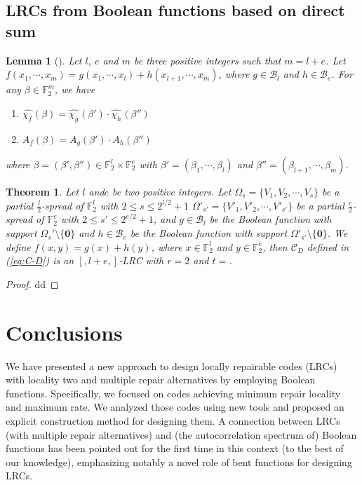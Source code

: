 \documentclass[10pt]{article}
\newtheorem{theorem}{Theorem}
\newtheorem{lemma}{Lemma}
\newcommand{\F}{\mathbb{F}}
\newcommand{\0}{\textbf{0}}
\newcommand{\1}{\textbf{1}}
\newcommand{\C}{{\mathcal C}}
\newcommand{\W}[2][]{\widehat{\chi_{#2}}^{#1}}
\begin{document}
\subsection{LRCs from Boolean functions based on direct sum}
  \begin{lemma}[\cite{Seberry1994}]\label{disjoint}
    Let $l$, $e$ and $m$ be three positive integers such that $m=l+e$.
    Let $f(x_1,\cdots ,x_m)=g(x_1,\cdots, x_l)+h(x_{l+1}, \cdots,x_{m})$, where $g\in\mathcal{B}_l$ and $h\in\mathcal{B}_e$.
    For any $\beta\in\F_2^m$, we have
     \begin{enumerate}
     \item [1)] $\W f(\beta)=\W g(\beta')\cdot \W h(\beta'')$
     \item [2)] $A_f(\beta)=A_g(\beta')\cdot A_h(\beta'')$
     \end{enumerate}
     where $\beta=(\beta',\beta'')\in\F_2^l\times \F_2^{e}$ with $\beta'=(\beta_1,\cdots,\beta_l)$ and $\beta''=(\beta_{l+1},\cdots, \beta_{m})$.
    \end{lemma}

{\color{red}
\begin{theorem}\label{T:LRCDirectSum}
Let $l$ and$e$  be two positive integers.
Let $\Omega_{s}=\{V_1,V_2,\cdots,V_s\}$ be a partial $\frac{l}{2}$-spread of $\F_2^l$ with $2\leq s \le 2^{l/2}+1$
$\Omega'_{s'}=\{V'_1,V'_2,\cdots,V'_{s'}\}$ be a partial $\frac{e}{2}$-spread of $\F_2^e$ with $2\leq s' \le 2^{e/2}+1$,
and $g\in\mathcal{B}_{l}$ be the Boolean function with support $\Omega_s'\setminus\{\0\}$
and $h\in\mathcal{B}_{e}$ be the Boolean function with support $\Omega'_{s'}\setminus\{\0\}$.
We define $f(x,y)=g(x)+h(y)$, where $x\in\F_2^l$ and $y\in\F_2^e$, then
$\C_D$ defined in (\ref{eq:C-D}) is an $[  , l+e,  ]$-LRC with $r=2$ and $t=$.
\end{theorem}
\begin{proof}
dd
\end{proof}


}







\section{Conclusions}\label{Sec-conclusion}

We have presented a new approach to design locally repairable codes (LRCs) with locality two and multiple repair alternatives
by employing Boolean functions. Specifically, we focused on codes achieving minimum repair locality and maximum rate.
We analyzed those codes using new tools and proposed an explicit construction method for designing them.
A connection between LRCs (with multiple repair alternatives) and (the autocorrelation spectrum of) Boolean functions has been pointed out
for the first time in this context (to the best of our knowledge), emphasizing notably a novel role of bent functions for designing LRCs.
\end{document}
